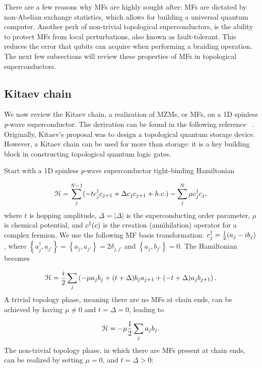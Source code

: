 There are a few reasons why MFs are highly sought after:
MFs are dictated by non-Abelian exchange statistics, which allows for building a universal quantum computer.
Another perk of non-trivial topological superconductors, is the ability to protect MFs from local perturbations, also known as fault-tolerant.
This reduces the error that qubits can acquire when performing a braiding operation.
The next few subsections will review these properties of MFs in topological superconductors.

\subsection{Kitaev chain}
We now review the Kitaev chain, a realization of MZMs, or MFs, on a 1D spinless \textit{p}-wave superconductor.
The derivation can be found in the following reference ~\cite{kitaevUnpairedMajoranaFermions2001}.
Originally, Kitaev's proposal was to design a topological quantum storage device.
However, a Kitaev chain can be used for more than storage: it is a key building block in constructing topological quantum logic gates.

Start with a 1D spinless \textit{p}-wave superconductor tight-binding Hamiltonian

\begin{equation}
  \mathcal{H} = \sum_j^{N-1} (-t c^{\dagger}_j c_{j+1} + \Delta c_j c_{j+1} + h.c.) - \sum_j^{N} \mu c^{\dagger}_j c_j,
\end{equation}
where $t$ is hopping amplitude, $\Delta = |\Delta|$ is the superconducting order parameter, $\mu$ is chemical potential, and $c^{\dagger} (c)$ is the creation (annihilation) operator for a complex fermion.
We use the following MF basis transformation: $c^{\dagger}_j = \tfrac{1}{2} (a_j - i b_j)$, where $\left\{ a^{\dagger}_j, a_{j'} \right\} = \left\{ a_j, a_{j'} \right\} = 2\delta_{j,j'}$ and $\left\{a_j,b_{j'}\right\} = 0$.
The Hamiltonian becomes

\begin{equation}
  \mathcal{H} = \dfrac{i}{2} \sum_j \left( -\mu a_j b_j + (t+\Delta) b_j a_{j+1} + (-t+\Delta) a_j b_{j+1} \right).
\end{equation}
A trivial topology phase, meaning there are no MFs at chain ends, can be achieved by having $\mu \neq 0$ and $t=\Delta=0$, leading to

\begin{equation}
  \mathcal{H} = -\mu\dfrac{1}{2} \sum_j a_j b_j.
\end{equation}
The non-trivial topology phase, in which there are MFs present at chain ends, can be realized by setting $\mu = 0$, and $t = \Delta > 0$:

